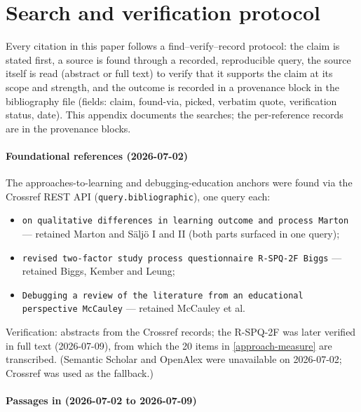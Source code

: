 \mode*
\section{Search and verification protocol}
\label{app:search}

Every citation in this paper follows a find--verify--record protocol: the
claim is stated first, a source is found through a recorded, reproducible
query, the source itself is read (abstract or full text) to verify that it
supports the claim at its scope and strength, and the outcome is recorded
in a provenance block in the bibliography file (fields: claim, found-via,
picked, verbatim quote, verification status, date).
This appendix documents the searches; the per-reference records are in the
provenance blocks.

\paragraph{Foundational references (2026-07-02)}

The approaches-to-learning and debugging-education anchors were found via
the Crossref REST API (\texttt{query.bibliographic}), one query each:
\begin{itemize}
  \item \texttt{on qualitative differences in learning outcome and process
    Marton} --- retained Marton and Säljö I and II (both parts surfaced in
    one query);
  \item \texttt{revised two-factor study process questionnaire R-SPQ-2F
    Biggs} --- retained Biggs, Kember and Leung;
  \item \texttt{Debugging a review of the literature from an educational
    perspective McCauley} --- retained McCauley et al.
\end{itemize}
Verification: abstracts from the Crossref records; the R-SPQ-2F was later
verified in full text (2026-07-09), from which the 20 items in
\cref{approach-measure} are transcribed.
(Semantic Scholar and OpenAlex were unavailable on 2026-07-02; Crossref
was used as the fallback.)

\paragraph{Passages in  (2026-07-02 to 2026-07-09)}

